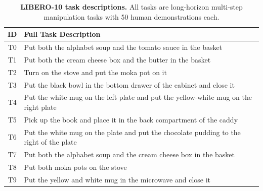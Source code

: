 \begin{table}[h]
\centering
\caption{\textbf{LIBERO-10 task descriptions.} All tasks are long-horizon multi-step manipulation tasks with 50 human demonstrations each.}
\label{tab:libero_tasks}
\small
\begin{tabular}{@{}cl@{}}
\toprule
\textbf{ID} & \textbf{Full Task Description} \\
\midrule
T0 & Put both the alphabet soup and the tomato sauce in the basket \\
T1 & Put both the cream cheese box and the butter in the basket \\
T2 & Turn on the stove and put the moka pot on it \\
T3 & Put the black bowl in the bottom drawer of the cabinet and close it \\
T4 & Put the white mug on the left plate and put the yellow-white mug on the right plate \\
T5 & Pick up the book and place it in the back compartment of the caddy \\
T6 & Put the white mug on the plate and put the chocolate pudding to the right of the plate \\
T7 & Put both the alphabet soup and the cream cheese box in the basket \\
T8 & Put both moka pots on the stove \\
T9 & Put the yellow and white mug in the microwave and close it \\
\bottomrule
\end{tabular}
\end{table}

